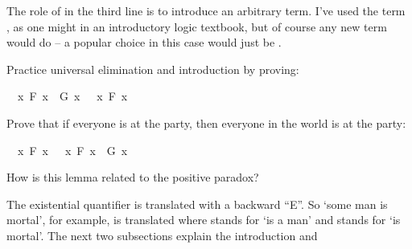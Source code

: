 \begin{isabellebody}
%
\endisatagproof
{\isafoldproof}%
%
\isadelimproof
%
\endisadelimproof
%
\begin{isamarkuptext}%
The role of  in the third line is to introduce an arbitrary term. I've used the
term , as one might in an introductory logic textbook, but of course any new term would do 
-- a popular choice in this case would just be .%
\end{isamarkuptext}\isamarkuptrue%
%
\begin{isamarkuptext}%
\begin{Exercise} Practice universal elimination and introduction by proving: \end{Exercise}%
\end{isamarkuptext}\isamarkuptrue%
\isamarkupfalse%
\ {\isachardoublequoteopen}{\isacharparenleft}{\isasymforall}\ x{\isachardot}\ F\ x\ {\isasymand}\ G\ x{\isacharparenright}\ {\isasymlongrightarrow}\ {\isacharparenleft}{\isasymforall}\ x{\isachardot}\ F\ x{\isacharparenright}{\isachardoublequoteclose}%
\isadelimproof
\ %
\endisadelimproof
%
\isatagproof
{}\isamarkupfalse%
%
\endisatagproof
{\isafoldproof}%
%
\isadelimproof
%
\endisadelimproof
%
\begin{isamarkuptext}%
\begin{Exercise} Prove that if everyone is at the party, then everyone in the world is at the party: \end{Exercise}%
\end{isamarkuptext}\isamarkuptrue%
\isamarkupfalse%
\ {\isachardoublequoteopen}{\isacharparenleft}{\isasymforall}\ x{\isachardot}\ F\ x{\isacharparenright}\ {\isasymlongrightarrow}\ {\isacharparenleft}{\isasymforall}\ x{\isachardot}\ F\ x\ {\isasymlongrightarrow}\ G\ x{\isacharparenright}{\isachardoublequoteclose}%
\isadelimproof
\ %
\endisadelimproof
%
\isatagproof
{}\isamarkupfalse%
%
\endisatagproof
{\isafoldproof}%
%
\isadelimproof
%
\endisadelimproof
%
\begin{isamarkuptext}%
How is this lemma related to the positive paradox?%
\end{isamarkuptext}\isamarkuptrue%
%
\isamarkuptrue%
%
\begin{isamarkuptext}%
The existential quantifier is translated with a backward ``E''. So `some man is mortal', for
example, is translated  where  stands for `is a man'
and  stands for `is mortal'. The next two subsections explain the introduction and

\end{isamarkuptext}
\end{isabellebody}
